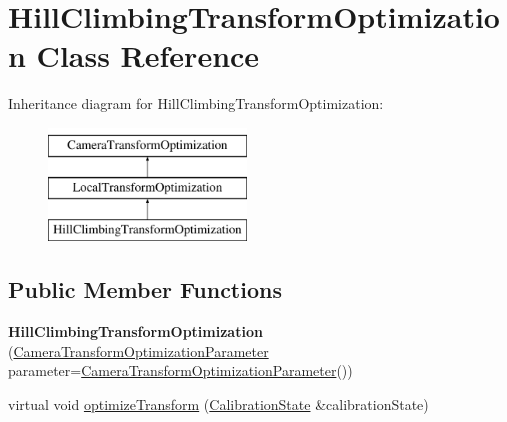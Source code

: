 \hypertarget{classHillClimbingTransformOptimization}{\section{\-Hill\-Climbing\-Transform\-Optimization \-Class \-Reference}
\label{classHillClimbingTransformOptimization}
}
\-Inheritance diagram for \-Hill\-Climbing\-Transform\-Optimization\-:\begin{figure}[H]
\begin{center}
\leavevmode
\includegraphics[height=3.000000cm]{classHillClimbingTransformOptimization}
\end{center}
\end{figure}
\subsection*{\-Public \-Member \-Functions}
\begin{DoxyCompactItemize}
\item 
\hypertarget{classHillClimbingTransformOptimization_aec6c9d518076d7a45fd084b4083b26ee}{{\bfseries \-Hill\-Climbing\-Transform\-Optimization} (\hyperlink{classCameraTransformOptimizationParameter}{\-Camera\-Transform\-Optimization\-Parameter} parameter=\hyperlink{classCameraTransformOptimizationParameter}{\-Camera\-Transform\-Optimization\-Parameter}())}\label{classHillClimbingTransformOptimization_aec6c9d518076d7a45fd084b4083b26ee}

\item 
virtual void \hyperlink{classHillClimbingTransformOptimization_a4f7fb583e57929790420e1f28d97c383}{optimize\-Transform} (\hyperlink{classCalibrationState}{\-Calibration\-State} \&calibration\-State)
\end{DoxyCompactItemize}


